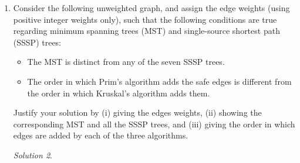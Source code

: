 \documentclass[12pt]{article}
\theoremstyle{remark}
\newtheorem*{solution}{Solution}
\begin{document}
\begin{enumerate}
\begin{enumerate}[label=(\alph*)]
\begin{solution}
\end{solution}
 
\end{enumerate}

\item Consider the following unweighted graph, and assign the edge weights (using positive integer weights only), such that the following conditions are true regarding minimum spanning trees (MST) and single-source shortest path (SSSP) trees:
	\begin{itemize}
	\itemsep-0.1pt
	\item The MST is distinct from any of the seven SSSP trees.
	\item The order in which Prim's algorithm adds the safe edges is different from the order in which Kruskal's algorithm adds them.
	\end{itemize}
	Justify your solution by (i) giving the edges weights, (ii) showing the corresponding MST and all the SSSP trees, and (iii) giving the order in which edges are added by each of the three algorithms. 	
	\begin{figure}[h!]
\begin{center}
\end{center}
\end{figure}

\begin{solution}

\end{solution}

\end{enumerate}
\end{document}
